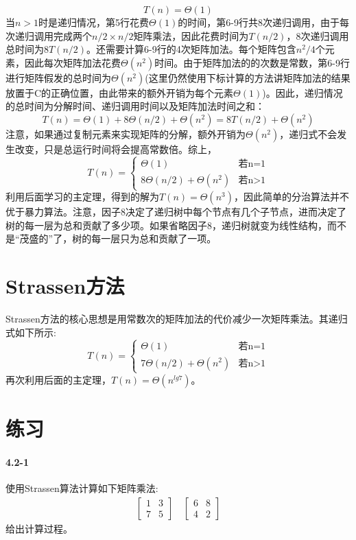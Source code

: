 \documentclass[a4paper,11pt]{article}
\begin{document}
\[
	T(n) = \Theta(1)
\]
当$n>1$时是递归情况，第5行花费$\Theta(1)$的时间，第6-9行共8次递归调用，由于每次递归调用完成两个$n/2 \times n/2$矩阵乘法，因此花费时间为$T(n/2)$，8次递归调用总时间为$8T(n/2)$。还需要计算6-9行的4次矩阵加法。每个矩阵包含$n^2/4$个元素，因此每次矩阵加法花费$\Theta(n^2)$时间。由于矩阵加法的的次数是常数，第6-9行进行矩阵假发的总时间为$\Theta(n^2)$(这里仍然使用下标计算的方法讲矩阵加法的结果放置于C的正确位置，由此带来的额外开销为每个元素$\Theta(1)$)。因此，递归情况的总时间为分解时间、递归调用时间以及矩阵加法时间之和：
\[
	T(n) = \Theta(1)+8\Theta(n/2)+\Theta(n^2)=8T(n/2)+\Theta(n^2)
\]
注意，如果通过复制元素来实现矩阵的分解，额外开销为$\Theta(n^2)$，递归式不会发生改变，只是总运行时间将会提高常数倍。综上，
\[
	T(n) = 
	\begin{cases}
	\Theta(1) & \text{若n=1}\\
	8\Theta(n/2)+\Theta(n^2) & \text{若n>1}
	\end{cases}
\]
利用后面学习的主定理，得到的解为$T(n)=\Theta(n^3)$，因此简单的分治算法并不优于暴力算法。注意，因子8决定了递归树中每个节点有几个子节点，进而决定了树的每一层为总和贡献了多少项。如果省略因子8，递归树就变为线性结构，而不是“茂盛的”了，树的每一层只为总和贡献了一项。
\section*{Strassen方法}
Strassen方法的核心思想是用常数次的矩阵加法的代价减少一次矩阵乘法。其递归式如下所示:
\[
	T(n) = 
	\begin{cases}
		\Theta(1) & \text{若n=1} \\
		7\Theta(n/2) + \Theta(n^2) &\text{若n>1}
	\end{cases}
\]
再次利用后面的主定理，$T(n)=\Theta(n^{lg7})$。
\section*{练习}
\paragraph*{4.2-1}
使用Strassen算法计算如下矩阵乘法:
\[
	\begin{gathered}
		\begin{bmatrix}
			1 & 3\\
			7 & 5
		\end{bmatrix}
		\quad
		\begin{bmatrix}
			6 & 8\\
			4 & 2
		\end{bmatrix}
	\end{gathered}
\]
给出计算过程。\\
\end{document}
